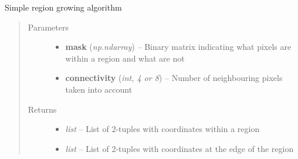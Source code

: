 \documentclass[letterpaper,10pt,english]{sphinxmanual}
\begin{document}
\begin{fulllineitems}
\label{flamingo/segmentation/index:flamingo.segmentation.postprocess.region_growing}
Simple region growing algorithm
\begin{quote}\begin{description}
\item[{Parameters}] \leavevmode\begin{itemize}
\item {} 
\textbf{mask} (\emph{np.ndarray}) -- Binary matrix indicating what pixels are within a region and
what are not

\item {} 
\textbf{connectivity} (\emph{int, 4 or 8}) -- Number of neighbouring pixels taken into account

\end{itemize}

\item[{Returns}] \leavevmode
\begin{itemize}
\item {} 
\emph{list} --
List of 2-tuples with coordinates within a region

\item {} 
\emph{list} --
List of 2-tuples with coordinates at the edge of the region

\end{itemize}


\end{description}\end{quote}

\end{fulllineitems}

\end{document}
